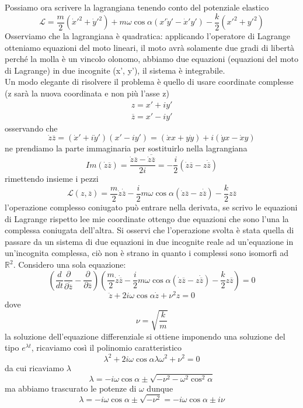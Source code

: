 \documentclass[
10pt, %
a4paper, %
oneside, %
headinclude,footinclude, %
BCOR5mm, %
]{scrartcl}
\begin{document}
\begin{esercizio}
	Possiamo ora scrivere la lagrangiana tenendo conto del potenziale elastico
	\[\mathcal{L} = \frac{m}{2}(\dot{x}'^2+\dot{y}'^2) +m\omega \cos\alpha(x'\dot{y}'-\dot{x}'y')-\frac{k}{2}(x'^2+y'^2)\]
	Osserviamo che la lagrangiana è quadratica: applicando l'operatore di Lagrange otteniamo equazioni del moto lineari, il moto avrà solamente due gradi di libertà perché la molla è un vincolo olonomo, abbiamo due equazioni (equazioni del moto di Lagrange) in due incognite (x', y'), il sistema è integrabile.\\
	Un modo elegante di risolvere il problema è quello di usare coordinate complesse (z sarà la nuova coordinata e non più l'asse z)
	\begin{align*}
		z = x'+iy'\\
		\overline{z} = x'-iy'
	\end{align*}
	osservando che
	\[\dot{z}\overline{z} = (\dot{x}'+i\dot{y}')(x'-iy') = (\dot{x}x+y\dot{y})+i(\dot{y}x-\dot{x}y)\]
	ne prendiamo la parte immaginaria per sostituirlo nella lagrangiana
	\[Im(\dot{z}\overline{z}) = \frac{\dot{z}\overline{z}-\overline{\dot{z}\overline{z}}}{2i} = -\frac{i}{2}(\dot{z}\overline{z}-z\dot{\overline{z}})\]
	rimettendo insieme i pezzi
	\[\mathcal{L}(z, \overline{z}) = \frac{m}{2}\dot{z}\dot{\overline{z}}-\frac{i}{2}m\omega\cos\alpha(\dot{z}\overline{z}-z\dot{\overline{z}})-\frac{k}{2}z\overline{z}\]
	l'operazione complesso coniugato può entrare nella derivata, se scrivo le equazioni di Lagrange rispetto lee mie coordinate ottengo due equazioni che sono l'una la complessa coniugata dell'altra. Si osservi che l'operazione svolta è stata quella di passare da un sistema di due equazioni in due incognite reale ad un'equazione in un'incognita complessa, ciò non è strano in quanto i complessi sono isomorfi ad \(\mathbb{R}^2\). Considero una sola equazione: 
	\[\left(\frac{d}{dt}\frac{\partial}{\partial \dot{\overline{z}}}-\frac{\partial}{\partial \overline{z}}\right)\left(\frac{m}{2}\dot{z}\dot{\overline{z}}-\frac{i}{2}m\omega\cos\alpha(\dot{z}\overline{z}-z\dot{\overline{z}})-\frac{k}{2}z\overline{z}\right) = 0\]
	\[\ddot{z}+2i\omega\cos\alpha \dot{z}+\nu^2 z = 0\]
	dove
	\[\nu= \sqrt{\frac{k}{m}}\]
	la soluzione dell'equazione differenziale si ottiene imponendo una soluzione del tipo \(e^{\lambda t}\), ricaviamo così il polinomio caratteristico
	\[\lambda^2+2i\omega\cos\alpha\lambda \omega^2 + \nu^2 = 0\]
	da cui ricaviamo $\lambda$ 
	\[\lambda = -i\omega\cos\alpha\pm\sqrt{-\nu^2-\omega^2\cos^2\alpha}\]
	ma abbiamo trascurato le potenze di $\omega$ dunque
	\[\lambda = -i\omega\cos\alpha\pm\sqrt{-\nu^2} = -i\omega\cos\alpha\pm i\nu\]

\end{esercizio}
\end{document}
